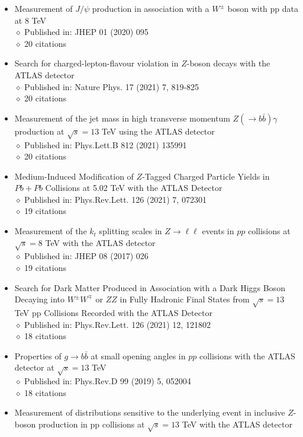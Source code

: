 \documentclass[margin, 10pt]{res} %
\begin{document}
\begin{resume}
\begin{itemize}
\item Measurement of $J/\psi$ production in association with a $W^{\pm}$ boson with pp data at 8 TeV\\
$\diamond$ Published in: JHEP 01 (2020) 095\\
$\diamond$ 20 citations
\item Search for charged-lepton-flavour violation in $Z$-boson decays with the ATLAS detector\\
$\diamond$ Published in: Nature Phys. 17 (2021) 7, 819-825\\
$\diamond$ 20 citations
\item Measurement of the jet mass in high transverse momentum $Z(\rightarrow b\bar{b})\gamma$ production at $\sqrt{s} = 13$ TeV using the ATLAS detector\\
$\diamond$ Published in: Phys.Lett.B 812 (2021) 135991\\
$\diamond$ 20 citations
\item Medium-Induced Modification of $Z$-Tagged Charged Particle Yields in $Pb+Pb$ Collisions at 5.02 TeV with the ATLAS Detector\\
$\diamond$ Published in: Phys.Rev.Lett. 126 (2021) 7, 072301\\
$\diamond$ 19 citations
\item Measurement of the $k_{t}$ splitting scales in $Z\rightarrow\ell\ell$ events in $pp$ collisions at $\sqrt{s} = 8$ TeV with the ATLAS detector\\
$\diamond$ Published in: JHEP 08 (2017) 026\\
$\diamond$ 19 citations
\item Search for Dark Matter Produced in Association with a Dark Higgs Boson Decaying into $W^{\pm}W^{\mp}$ or $ZZ$ in Fully Hadronic Final States from $\sqrt{s} = 13$ TeV pp Collisions Recorded with the ATLAS Detector\\
$\diamond$ Published in: Phys.Rev.Lett. 126 (2021) 12, 121802\\
$\diamond$ 18 citations
\item Properties of $g\rightarrow b\bar{b}$ at small opening angles in $pp$ collisions with the ATLAS detector at $\sqrt{s} = 13$ TeV\\
$\diamond$ Published in: Phys.Rev.D 99 (2019) 5, 052004\\
$\diamond$ 18 citations
\item Measurement of distributions sensitive to the underlying event in inclusive $Z$-boson production in pp collisions at $\sqrt{s} = 13$ TeV with the ATLAS detector\\

\end{itemize}
\end{resume}
\end{document}
